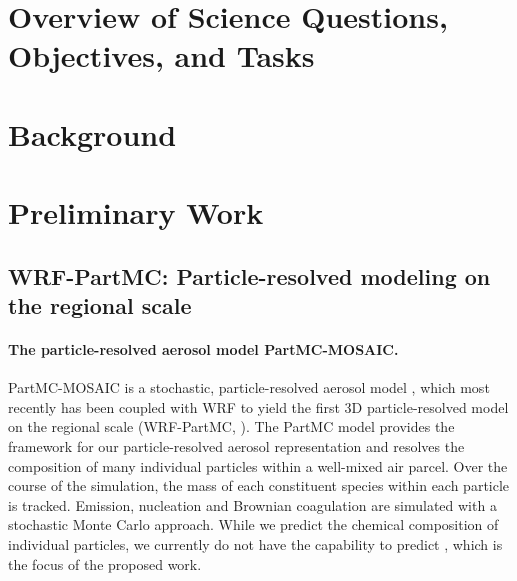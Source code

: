 \documentclass[11pt]{article}
\begin{document}
\section{Overview of Science Questions, Objectives, and Tasks}

\section{Background}



\section{Preliminary Work}
\label{sec:tools}


\subsection{WRF-PartMC: Particle-resolved modeling on the regional scale}

\paragraph{The particle-resolved aerosol model PartMC-MOSAIC.}
PartMC-MOSAIC is a stochastic, particle-resolved aerosol model
\citep{Riemer2009a,Zaveri2008}, which most recently has been coupled
with WRF to yield the first 3D particle-resolved model on the regional
scale (WRF-PartMC, \citep{Curtis2017,Curtis2019}).
The PartMC model provides the framework for our particle-resolved
aerosol representation and resolves the composition of many individual
particles within a well-mixed air parcel. Over the course of the
simulation, the mass of each constituent species within each particle
is tracked. Emission, nucleation and Brownian coagulation are
simulated with a stochastic Monte Carlo approach. While we predict the
chemical composition of individual particles, we currently do not have
the capability to predict {\color{red}{particle morphology}}, which is the
  focus of the proposed work.
\end{document}
